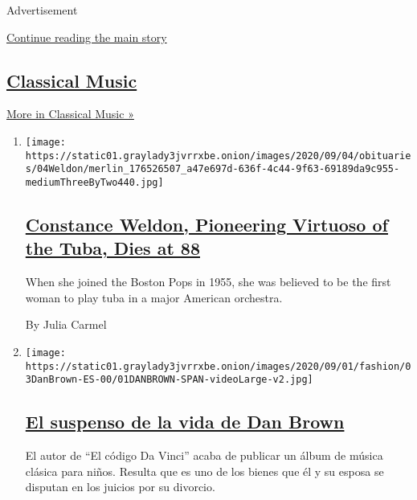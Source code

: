 Advertisement

\protect\hyperlink{after-mid1}{Continue reading the main story}

\hypertarget{classical-music}{%
\subsection{\texorpdfstring{\href{/spotlight/classical-music-reviews}{Classical
Music}}{Classical Music}}\label{classical-music}}

\href{/spotlight/classical-music-reviews}{More in Classical Music »}

\begin{enumerate}
\def\labelenumi{\arabic{enumi}.}
\item
  \texttt{[image: https://static01.graylady3jvrrxbe.onion/images/2020/09/04/obituaries/04Weldon/merlin\_176526507\_a47e697d-636f-4c44-9f63-69189da9c955-mediumThreeByTwo440.jpg]}

  \hypertarget{constance-weldon-pioneering-virtuoso-of-the-tuba-dies-at-88}{%
  \subsection{\texorpdfstring{\href{/2020/09/07/arts/music/constance-weldon-dead.html}{Constance
  Weldon, Pioneering Virtuoso of the Tuba, Dies at
  88}}{Constance Weldon, Pioneering Virtuoso of the Tuba, Dies at 88}}\label{constance-weldon-pioneering-virtuoso-of-the-tuba-dies-at-88}}

  When she joined the Boston Pops in 1955, she was believed to be the
  first woman to play tuba in a major American orchestra.

  By Julia Carmel
\item
  \texttt{[image: https://static01.graylady3jvrrxbe.onion/images/2020/09/01/fashion/03DanBrown-ES-00/01DANBROWN-SPAN-videoLarge-v2.jpg]}

  \hypertarget{el-suspenso-de-la-vida-de-dan-brown}{%
  \subsection{\texorpdfstring{\href{/es/2020/09/03/espanol/estilos-de-vida/dan-brown-divorcio-disco.html}{El
  suspenso de la vida de Dan
  Brown}}{El suspenso de la vida de Dan Brown}}\label{el-suspenso-de-la-vida-de-dan-brown}}

  El autor de ``El código Da Vinci'' acaba de publicar un álbum de
  música clásica para niños. Resulta que es uno de los bienes que él y
  su esposa se disputan en los juicios por su divorcio.


\end{enumerate}

